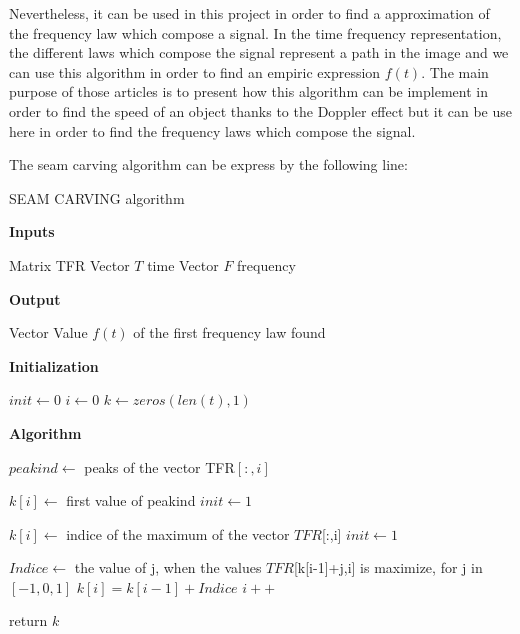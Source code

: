 Nevertheless, it can be used in this project in order to find a approximation of the frequency law which compose a signal. In the time frequency representation, the different laws which compose the signal represent a path in the image and we can use this algorithm in order to find an empiric expression $f(t)$.
The main purpose of those articles \cite{barnwal2013doppler} \cite{couvreur1997doppler} \cite{cevher2009vehicle} is to present how this algorithm can be implement in order to find the speed of an object thanks to the Doppler effect but it can be use here in order to find the frequency laws which compose the signal. 

The seam carving algorithm can be express by the following line:

\begin{algorithm}[H]
  \caption{SEAM CARVING algorithm }
  
  \textbf{Inputs}%
  \begin{algorithmic}[1]
    \STATE Matrix TFR
    \STATE Vector $T$ time
    \STATE Vector $F$ frequency
  \end{algorithmic}
  \bigskip

  \textbf{Output}%
  \begin{algorithmic}[1]
    \STATE Vector Value $f(t)$ of the first frequency law found
  \end{algorithmic}
  \bigskip
  
  \textbf{Initialization}%
  \begin{algorithmic}[1]
   	\STATE $init\gets 0$
   	\STATE $i\gets 0$
	\STATE $k\gets zeros(len(t),1)$
  \end{algorithmic}
  
  
  \textbf{Algorithm}%
  \begin{algorithmic}[1]

     	  	\STATE $peakind\gets$ peaks of the vector TFR$[:,i]$
     	
	 	
				\STATE $k[i]\gets$ first value of peakind
				\STATE $init\gets 1$
				
	 	
			\ELSE{}
					\STATE $k[i]\gets$ indice of the maximum of the vector $TFR$[:,i]
					\STATE $init\gets 1$
				\ENDIF
			\ENDIF
				
		\ELSE
			\STATE $Indice\gets$ the value of j, when the values $TFR$[k[i-1]+j,i] is maximize, for j in $[-1,0,1]$
			\STATE $k[i] = k[i-1] + Indice$
	 	\ENDIF
	 	\STATE $i++$
	\ENDWHILE 
	
	
  return $k$


  \end{algorithmic}
\end{algorithm}

